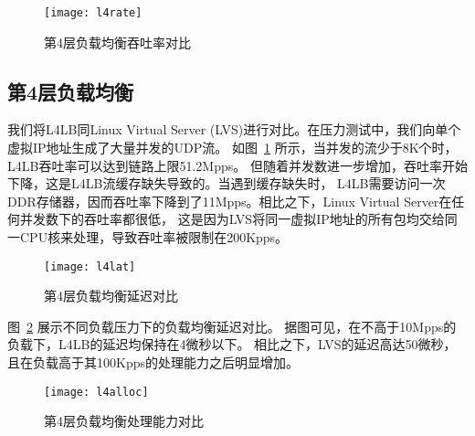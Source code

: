 \begin{figure}[htbp]
\centering
\texttt{[image: l4rate]}
\caption{第4层负载均衡吞吐率对比} \label{fig:l4rate}
\end{figure}

\subsection{第4层负载均衡}
我们将L4LB同Linux Virtual Server (LVS)进行对比。在压力测试中，我们向单个虚拟IP地址生成了大量并发的UDP流。
如图~\ref{fig:l4rate} 所示，当并发的流少于8K个时，L4LB吞吐率可以达到链路上限51.2Mpps。
但随着并发数进一步增加，吞吐率开始下降，这是L4LB流缓存缺失导致的。当遇到缓存缺失时，
L4LB需要访问一次DDR存储器，因而吞吐率下降到了11Mpps。相比之下，Linux Virtual Server在任何并发数下的吞吐率都很低，
这是因为LVS将同一虚拟IP地址的所有包均交给同一CPU核来处理，导致吞吐率被限制在200Kpps。

\begin{figure}[htbp]
\centering
\texttt{[image: l4lat]}
\caption{第4层负载均衡延迟对比} \label{fig:l4lat}
\end{figure}
图~\ref{fig:l4lat} 展示不同负载压力下的负载均衡延迟对比。
据图可见，在不高于10Mpps的负载下，L4LB的延迟均保持在4微秒以下。
相比之下，LVS的延迟高达50微秒，且在负载高于其100Kpps的处理能力之后明显增加。

\begin{figure}[htbp]
\centering
\texttt{[image: l4alloc]}
\caption{第4层负载均衡处理能力对比} \label{fig:l4alloc}
\end{figure}

